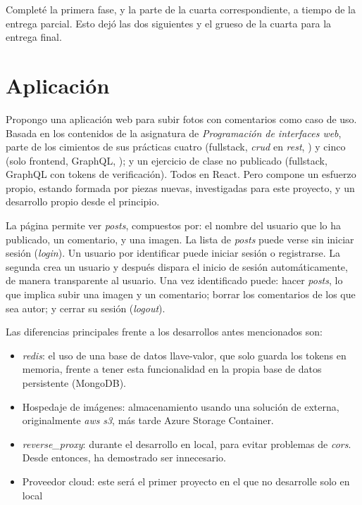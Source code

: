 \documentclass[11pt]{article}
\begin{document}
\begin{flushleft}
    Completé la primera fase, y la parte de la cuarta correspondiente, a tiempo de la entrega parcial. Esto dejó las dos siguientes y el grueso de la cuarta para la entrega final.
    












\clearpage
\section{Aplicación}
Propongo una aplicación web para subir fotos con comentarios como caso de uso. Basada en los contenidos de la asignatura de \textit{Programación de interfaces web}, parte de los cimientos de sus prácticas cuatro (fullstack, \textit{\acrshort{crud}} en \textit{\acrshort{rest}}, \cite{misgit1}) y cinco (solo frontend, GraphQL, \cite{misgit2}); y un ejercicio de clase no publicado (fullstack, GraphQL con tokens de verificación). Todos en React. Pero compone un esfuerzo propio, estando formada por piezas nuevas, investigadas para este proyecto, y un desarrollo propio desde el principio.
\linebreak

La página permite ver \textit{posts}, compuestos por: el nombre del usuario que lo ha publicado, un comentario, y una imagen. La lista de \textit{posts} puede verse sin iniciar sesión (\textit{login}). Un usuario por identificar puede iniciar sesión o registrarse. La segunda crea un usuario y después dispara el inicio de sesión automáticamente, de manera transparente al usuario. Una vez identificado puede: hacer \textit{posts}, lo que implica subir una imagen y un comentario; borrar los comentarios de los que sea autor; y cerrar su sesión (\textit{logout}). 
\linebreak 

Las diferencias principales frente a los desarrollos antes mencionados son: 

	\begin{itemize}
		\itemsep0em 
		\item \textit{\gls{redis}}: el uso de una base de datos llave-valor, que solo guarda los tokens en memoria, frente a tener esta funcionalidad en la propia base de datos persistente (MongoDB).
		\item Hospedaje de imágenes: almacenamiento usando una solución de externa, originalmente \textit{\acrshort{aws}} \textit{\acrshort{s3}}, más tarde Azure Storage Container.
		\item \textit{\gls{reverse_proxy}}: durante el desarrollo en local, para evitar problemas de \textit{\acrshort{cors}}. Desde entonces, ha demostrado ser innecesario.
		\item Proveedor cloud: este será el primer proyecto en el que no desarrolle solo en local
	\end{itemize}


\end{flushleft}
\end{document}
